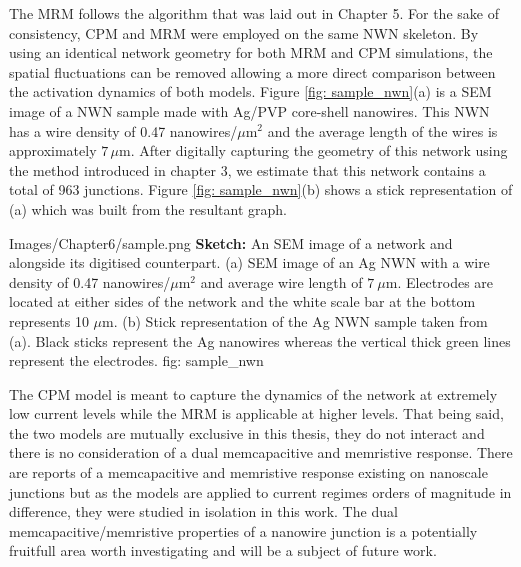 The MRM follows the algorithm that was laid out in Chapter 5. For the sake of consistency, CPM and MRM were employed on the same NWN skeleton. By using an identical network geometry for both MRM and CPM simulations, the spatial fluctuations can be removed allowing a more direct comparison between the activation dynamics of both models. Figure \ref{fig: sample_nwn}(a) is a SEM image of a NWN sample made with Ag/PVP core-shell nanowires. This NWN has a wire density of 0.47 nanowires/$\mu$m$^2$ and the average length of the wires is approximately $7\, \mu$m. After digitally capturing the geometry of this network using the method introduced in chapter 3, we estimate that this network contains a total of 963 junctions. Figure \ref{fig: sample_nwn}(b) shows a stick representation of (a) which was built from the resultant graph\cite{rocha2015}. 

{Images/Chapter6/sample.png}
{\textbf{Sketch:} An SEM image of a network and alongside its digitised counterpart.}
{(a) SEM image of an Ag NWN with a wire density of 0.47 nanowires/$\mu$m$^2$ and average wire length of $7~ \mu$m. Electrodes are located at either sides of the network and the white scale bar at the bottom represents 10 $\mu$m. (b) Stick representation of the Ag NWN sample taken from (a). Black sticks represent the Ag nanowires whereas the vertical thick green lines represent the electrodes\cite{ocallaco2018}.}
{fig: sample_nwn}

The CPM model is meant to capture the dynamics of the network at extremely low current levels while the MRM is applicable at higher levels. That being said, the two models are mutually exclusive in this thesis, they do not interact and there is no consideration of a dual memcapacitive and memristive response. There are reports of a memcapacitive and memristive response existing on nanoscale junctions\cite{hartmann2017,maier2016,wakrim2016,liu2006} but as the models are applied to current regimes orders of magnitude in difference, they were studied in isolation in this work. The dual memcapacitive/memristive properties of a nanowire junction is a potentially fruitfull area worth investigating and will be a subject of future work.
